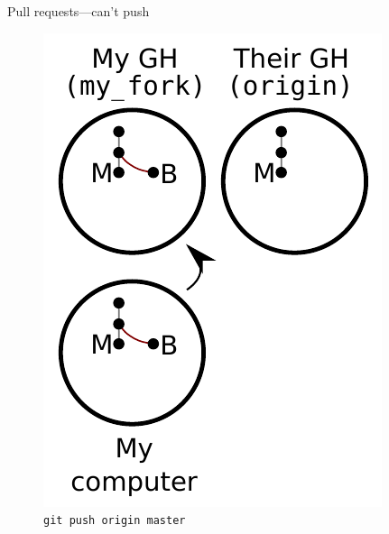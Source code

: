 \begin{frame}{Pull requests---can't push}
  \begin{figure}
    \includegraphics{fork_008.pdf}
    \\ \texttt{git push origin master}
    \\ \texttt{}
  \end{figure}
\end{frame}

